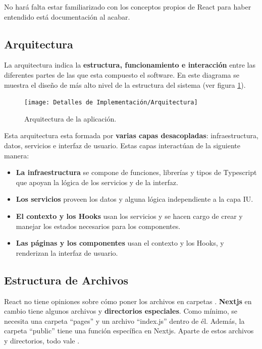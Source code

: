 \documentclass[12pt,twoside,titlepage]{report}
\begin{document}
No hará falta estar familiarizado con los conceptos propios de React para haber entendido está documentación al acabar.

\subsection{Arquitectura}
\label{sec:arquitectura}

La arquitectura indica la \textbf{estructura, funcionamiento e interacción} entre las diferentes partes de las que esta compuesto el software. En este diagrama se muestra el diseño de más alto nivel de la estructura del sistema (ver figura \ref{fig:Arquitectura}).

\begin{figure}[H]
    \centering
    \texttt{[image: Detalles de Implementación/Arquitectura]}
    \caption{Arquitectura de la aplicación.}
    \label{fig:Arquitectura}
\end{figure}

Esta arquitectura esta formada por \textbf{varias capas desacopladas}: infraestructura, datos, servicios e interfaz de usuario. Estas capas interactúan de la siguiente manera:

\begin{itemize}
    \item \textbf{La infraestructura} se compone de funciones, librerías y tipos de Typescript que apoyan la lógica de los servicios y de la interfaz.
    \item \textbf{Los servicios} proveen los datos y alguna lógica independiente a la capa IU.
    \item \textbf{El contexto y los Hooks} usan los servicios y se hacen cargo de crear y manejar los estados necesarios para los componentes.
    \item \textbf{Las páginas y los componentes} usan el contexto y los Hooks, y renderizan la interfaz de usuario.
\end{itemize}

\subsection{Estructura de Archivos}
\label{sec:archivos}

React no tiene opiniones sobre cómo poner los archivos en carpetas \cite{reactArchivos}. \textbf{Nextjs} en cambio tiene algunos archivos y \textbf{directorios especiales}. Como mínimo, se necesita una carpeta ``pages'' y un archivo ``index.js'' dentro de él. Además, la carpeta ``public'' tiene una función específica en Nextjs. Aparte de estos archivos y directorios, todo vale \cite{nextjs2}.
\end{document}
